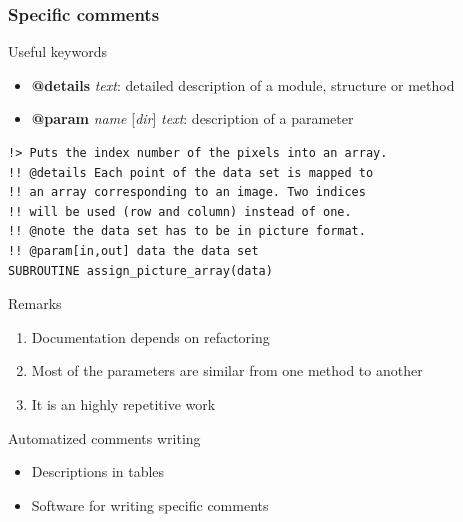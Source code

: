 \documentclass[10p]{beamer}
\begin{document}
\begin{frame}
\frametitle{Specific comments}
\begin{block}{Useful keywords}
\begin{itemize}
\item \textbf{@details} \textit{text}: detailed description of a module, structure or method
\item \textbf{@param} \textit{name} [\textit{dir}] \textit{text}: description of a parameter 
\end{itemize}
\end{block}
\begin{example}
\begin{lstlisting}
!> Puts the index number of the pixels into an array.
!! @details Each point of the data set is mapped to 
!! an array corresponding to an image. Two indices 
!! will be used (row and column) instead of one.
!! @note the data set has to be in picture format.
!! @param[in,out] data the data set
SUBROUTINE assign_picture_array(data)
\end{lstlisting}
\end{example}

\begin{alertblock}{Remarks}
\begin{enumerate}
\item Documentation depends on refactoring
\item Most of the parameters are similar from one method to another
\item It is an highly repetitive work
\end{enumerate}
\end{alertblock}
\begin{block}{Automatized comments writing}
\begin{itemize}
\item Descriptions in tables
\item Software for writing specific comments
\end{itemize}
\end{block}
\end{frame}
\end{document}
